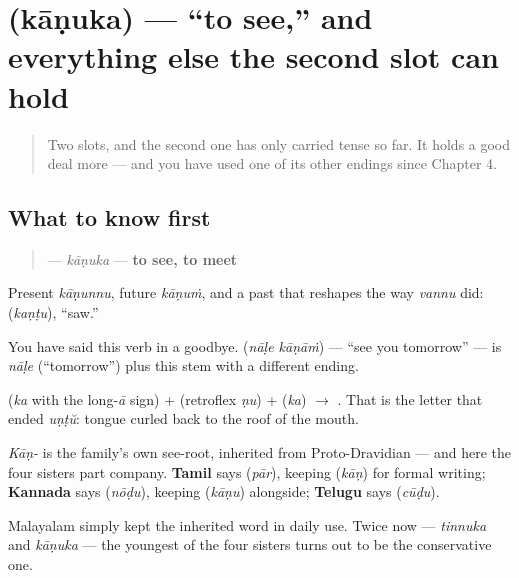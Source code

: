\section[\texorpdfstring{\ml{കാണുക} (kāṇuka)}{കാണുക (kāṇuka)}]{ (kāṇuka) — \textquotedblleft{}to see,\textquotedblright{} and everything else the second slot can hold}

\label{lesson:ML-C32-kaanuka}



\begin{quote}
Two slots, and the second one has only carried tense so far. It holds a good deal more — and you have used one of its other endings since Chapter 4.
\end{quote}

\subsection*{What to know first}
\begin{quote}
\textbf{} — \emph{kāṇuka} — \textbf{to see, to meet}
\end{quote}

Present \emph{kāṇunnu}, future \emph{kāṇuṁ}, and a past that reshapes the way \emph{vannu} did: \textbf{} (\emph{kaṇṭu}), \textquotedblleft{}saw.\textquotedblright{}

You have said this verb in a goodbye. \textbf{ } (\emph{nāḷe kāṇāṁ}) — \textquotedblleft{}see you tomorrow\textquotedblright{} — is \emph{nāḷe} (\textquotedblleft{}tomorrow\textquotedblright{}) plus this stem with a different ending.

\begin{sounds}
\textbf{} (\emph{ka} with the long-\emph{ā} sign) + \textbf{} (retroflex \emph{ṇu}) + \textbf{} (\emph{ka}) $\to$ \textbf{}. That \textbf{} is the letter that ended \emph{uṇṭŭ}: tongue curled back to the roof of the mouth.
\end{sounds}

\begin{cousinweb}
\emph{Kāṇ-} is the family's own see-root, inherited from Proto-Dravidian — and here the four sisters part company. \textbf{Tamil} says \textbf{} (\emph{pār}), keeping \textbf{} (\emph{kāṇ}) for formal writing; \textbf{Kannada} says \textbf{} (\emph{nōḍu}), keeping \textbf{} (\emph{kāṇu}) alongside; \textbf{Telugu} says \textbf{} (\emph{cūḍu}).

Malayalam simply kept the inherited word in daily use. Twice now — \emph{tinnuka} and \emph{kāṇuka} — the youngest of the four sisters turns out to be the conservative one.
\end{cousinweb}


